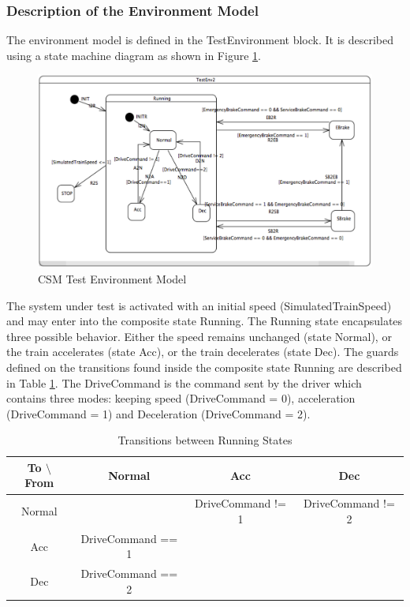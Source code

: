 \subsubsection{Description of the Environment Model}
The environment model is defined in the TestEnvironment block. It is
described using a state machine diagram as shown in
Figure \ref{fig:env}.

\begin{figure}[ht!]
	\centering
	\includegraphics[height=0.34\textheight]{figures/env}
	\caption{CSM Test Environment Model}
    \label{fig:env}
\end{figure}

The system under test is activated with an initial speed
(SimulatedTrainSpeed) and may enter into the composite state Running.
The Running state encapsulates three possible behavior. Either the
speed remains unchanged (state Normal), or the train accelerates
(state Acc), or the train decelerates (state Dec). The guards defined
on the transitions found inside the composite state Running are
described in Table \ref{tab:runningtr}. The DriveCommand is the
command sent by the driver which contains three modes: keeping speed
(DriveCommand = 0), acceleration (DriveCommand = 1) and Deceleration
(DriveCommand = 2).

\begin{table}[ht!]
\footnotesize
	\caption{Transitions between Running States}
	\begin{center}
    \begin{tabular}{|c|c|c|c|}
    \hline
    To $\setminus$ From  & Normal & Acc & Dec \\
    \hline
    Normal &   &  DriveCommand != 1  & DriveCommand != 2\\
    \hline
    Acc  & DriveCommand == 1 & &  \\
    \hline
    Dec  & DriveCommand == 2 & & \\
	\hline
    \end{tabular}
    \end{center}
\label{tab:runningtr}
\end{table} 

